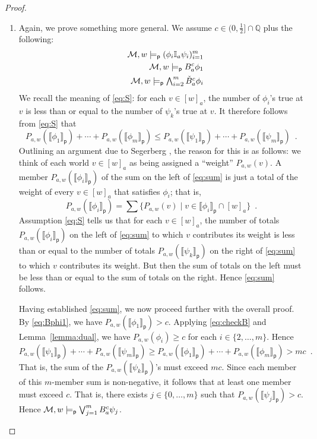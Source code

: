 \documentclass[12pt]{article}
\theoremstyle{definition}
\newcommand{\Rat}{\mathbb{Q}}  %
\newcommand{\M}{{\cal M}}      %
\newcommand{\modelsp}{\models_{\mathsf{p}}}                  %
\newcommand{\semp}[1]{\llbracket{#1}\rrbracket_{\mathsf{p}}} %
\begin{document}
\begin{proof}
\begin{enumerate}
  \item Again, we prove something more general. 
  We assume $c\in(0,\frac 12]\cap\Rat$ plus the following:
    \begin{eqnarray}
      &&
      \M,w\modelsp (\phi_i\mathbb{I}_a\psi_i)_{i=1}^m
      \label{eq:S}
      \\
      &&
      \M,w\modelsp B^c_a\phi_1
      \label{eq:Bphi1}
      \\
      &&
      \textstyle \M,w\modelsp \bigwedge_{i=2}^m\check B^c_a\phi_i
      \label{eq:checkB}
    \end{eqnarray}
    We recall the meaning of
    \eqref{eq:S}: for each $v\in[w]_a$, the number of
    $\phi_i$'s true at $v$ is less than or equal to the number of $\psi_k$'s true at $v$.
    It therefore follows from \eqref{eq:S} that
    \begin{equation}
      P_{a,w}(\semp{\phi_1})+\cdots+P_{a,w}(\semp{\phi_m})\leq
      P_{a,w}(\semp{\psi_1})+\cdots+P_{a,w}(\semp{\psi_m})\enspace.
      \label{eq:sum}
    \end{equation}
    Outlining an argument due to Segerberg 
    \cite[pp.~344--346]{Segerberg1971:qpiams},
    the reason for this is as follows: we think of each world $v\in[w]_a$ as being
    assigned a ``weight'' $P_{a,w}(v)$.  A member $P_{a,w}(\semp{\phi_i})$ of the
    sum on the left of \eqref{eq:sum} is just a total of the
    weight of every $v\in[w]_a$ that satisfies
    $\phi_i$; that is,
    \[
    P_{a,w}(\semp{\phi_i})=\sum\{P_{a,w}(v)\mid v\in\semp{\phi_i}\cap[w]_a\}\enspace.
    \]
    Assumption \eqref{eq:S} tells us that for each $v\in[w]_a$, the
    number of totals $P_{a,w}(\semp{\phi_i})$ on the left of
    \eqref{eq:sum} to which $v$ contributes its weight is less than or equal to the
    number of totals $P_{a,w}(\semp{\psi_k})$ on the right of
    \eqref{eq:sum} to which $v$ contributes its weight.  But then the
    sum of totals on the left must be less than or equal to the sum of totals on the
    right.  Hence \eqref{eq:sum} follows.

    Having established \eqref{eq:sum}, we now proceed further with the
    overall proof.  By \eqref{eq:Bphi1}, we have
    $P_{a,w}(\semp{\phi_1})>c$.  Applying \eqref{eq:checkB}
    and Lemma~\ref{lemma:dual}, we have $P_{a,w}(\phi_i)\geq
    c$ for each $i\in\{2,\dots,m\}$.  Hence
    \[
    P_{a,w}(\semp{\psi_1})+\cdots+P_{a,w}(\semp{\psi_m})\geq
    P_{a,w}(\semp{\phi_1})+\cdots+P_{a,w}(\semp{\phi_m})> mc\enspace.
    \]
    That is, the sum of the $P_{a,w}(\semp{\psi_k})$'s must exceed
    $mc$.  Since each member of this $m$-member sum is
    non-negative, it follows that at least one member must exceed
    $c$.  That is, there exists $j\in\{0,\dots,m\}$ such
    that $P_{a,w}(\semp{\psi_j})>c$.  Hence
    $\M,w\modelsp\bigvee_{j=1}^mB_a^c\psi_j$. \qedhere
  \end{enumerate}
\end{proof}
\end{document}
